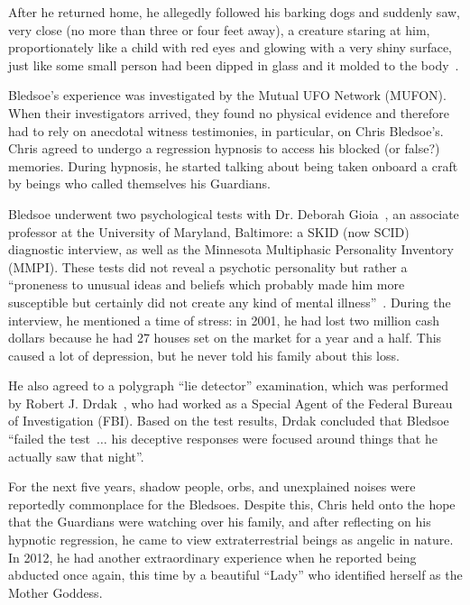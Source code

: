 After he returned home, he allegedly followed his barking dogs and suddenly saw, very close (no more than three or four feet away), a creature staring at him, proportionately like a child with red eyes and glowing with a very shiny surface, just like some small person had been dipped in glass and it molded to the body~\cite{UOE2008OctS1E1}.

Bledsoe's experience was investigated by the Mutual UFO Network (MUFON). When their investigators arrived, they found no physical evidence and therefore had to rely on anecdotal witness testimonies, in particular, on Chris Bledsoe's. Chris agreed to undergo a regression hypnosis to access his blocked (or false?) memories. During hypnosis, he started talking about being taken onboard a craft by beings who called themselves his Guardians.

Bledsoe underwent two psychological tests with Dr. Deborah Gioia~\cite{GioiaMaryland2023Feb}, an associate professor at the University of Maryland, Baltimore: a SKID (now SCID) diagnostic interview, as well as the Minnesota Multiphasic Personality Inventory (MMPI). These tests did not reveal a psychotic personality but rather a ``proneness to unusual ideas and beliefs which probably made him more susceptible but certainly did not create any kind of mental illness''~\cite{UOE2008OctS1E1}. During the interview, he mentioned a time of stress: in 2001, he had lost two million cash dollars because he had 27 houses set on the market for a year and a half. This caused a lot of depression, but he never told his family about this loss.

He also agreed to a polygraph ``lie detector'' examination, which was performed by Robert J. Drdak~\cite[time=2099s]{Drdak2023Feb}, who had worked as a Special Agent of the Federal Bureau of Investigation (FBI). Based on the test results, Drdak concluded that Bledsoe ``failed the test~$\ldots$ his deceptive responses were focused around things that he actually saw that night''\cite{UOE2008OctS1E1}.


For the next five years, shadow people, orbs, and unexplained noises were reportedly commonplace for the Bledsoes. Despite this, Chris held onto the hope that the Guardians were watching over his family, and after reflecting on his hypnotic regression, he came to view extraterrestrial beings as angelic in nature. In 2012, he had another extraordinary experience when he reported being abducted once again, this time by a beautiful ``Lady'' who identified herself as the Mother Goddess.

